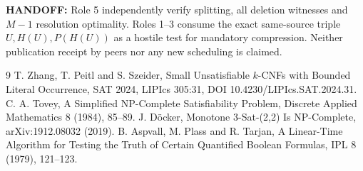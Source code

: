\documentclass[11pt]{article}
\begin{document}
\noindent\textbf{HANDOFF:} Role 5 independently verify splitting, all deletion witnesses and $M-1$ resolution optimality. Roles 1--3 consume the exact same-source triple $U,H(U),P(H(U))$ as a hostile test for mandatory compression. Neither publication receipt by peers nor any new scheduling is claimed.

\begin{thebibliography}{9}
 T. Zhang, T. Peitl and S. Szeider, Small Unsatisfiable $k$-CNFs with Bounded Literal Occurrence, SAT 2024, LIPIcs 305:31, DOI 10.4230/LIPIcs.SAT.2024.31.
 C. A. Tovey, A Simplified NP-Complete Satisfiability Problem, Discrete Applied Mathematics 8 (1984), 85--89.
 J. D\"ocker, Monotone 3-Sat-(2,2) Is NP-Complete, arXiv:1912.08032 (2019).
 B. Aspvall, M. Plass and R. Tarjan, A Linear-Time Algorithm for Testing the Truth of Certain Quantified Boolean Formulas, IPL 8 (1979), 121--123.
\end{thebibliography}
\end{document}
